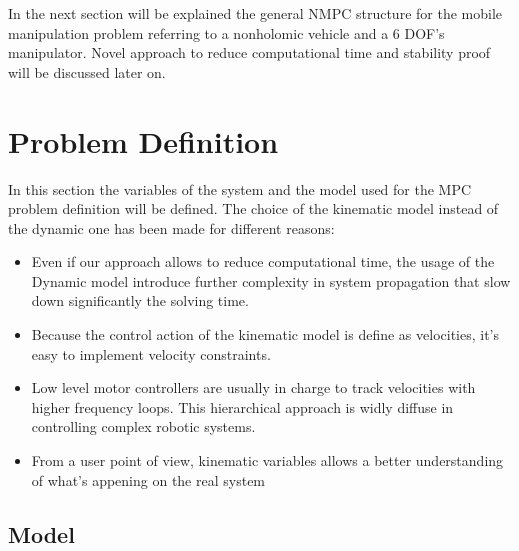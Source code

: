 In the next section will be explained the general NMPC structure for the mobile manipulation problem referring to a nonholomic vehicle and a 6 DOF's manipulator. Novel approach to reduce computational time and stability proof will be discussed later on.

\section{Problem Definition}

In this section the variables of the system and the model used for the MPC problem definition will be defined. The choice of the kinematic model instead of the dynamic one has been made for different reasons:

\begin{itemize}
\item Even if our approach allows to reduce computational time, the usage of the Dynamic model introduce further complexity in system propagation that slow down significantly the solving time.
\item Because the control action of the kinematic model is define as velocities, it's easy to implement velocity constraints.
\item Low level motor controllers are usually in charge to track velocities with higher frequency loops. This hierarchical approach is widly diffuse in controlling complex robotic systems.
\item From a user point of view, kinematic variables allows a better understanding of what's appening on the real system
\end{itemize}

\subsection{Model}

